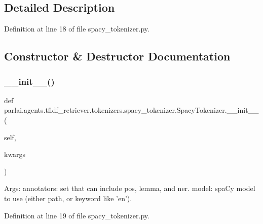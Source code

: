 \subsection{Detailed Description}


Definition at line 18 of file spacy\+\_\+tokenizer.\+py.



\subsection{Constructor \& Destructor Documentation}
\mbox{\label{classparlai_1_1agents_1_1tfidf__retriever_1_1tokenizers_1_1spacy__tokenizer_1_1SpacyTokenizer_a091dbfa93db9f2dfdaae3779c24aecb0}} 
\subsubsection{\texorpdfstring{\+\_\+\+\_\+init\+\_\+\+\_\+()}{\_\_init\_\_()}}
{\footnotesize\ttfamily def parlai.\+agents.\+tfidf\+\_\+retriever.\+tokenizers.\+spacy\+\_\+tokenizer.\+Spacy\+Tokenizer.\+\_\+\+\_\+init\+\_\+\+\_\+ (\begin{DoxyParamCaption}\item[{}]{self,  }\item[{}]{kwargs }\end{DoxyParamCaption})}

\begin{DoxyVerb}Args:
    annotators: set that can include pos, lemma, and ner.
    model: spaCy model to use (either path, or keyword like 'en').
\end{DoxyVerb}
 

Definition at line 19 of file spacy\+\_\+tokenizer.\+py.


